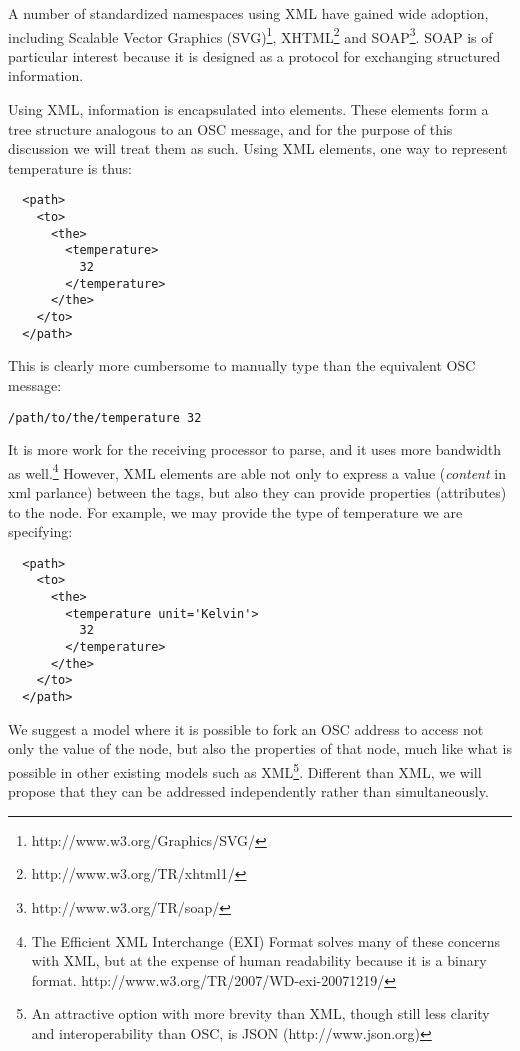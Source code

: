 \documentclass{NIME-alternate}
\begin{document}

A number of standardized namespaces using XML have gained wide adoption, including Scalable Vector Graphics (SVG)\footnote{http://www.w3.org/Graphics/SVG/}, XHTML\footnote{http://www.w3.org/TR/xhtml1/} and SOAP\footnote{http://www.w3.org/TR/soap/}.  SOAP is of particular interest because it is designed as a protocol for exchanging structured information.

Using XML, information is encapsulated into elements.  These elements form a tree structure analogous to an OSC message, and for the purpose of this discussion we will treat them as such.  Using XML elements, one way to represent temperature is thus:

\begin{lstlisting}
  <path>
    <to>
      <the>
        <temperature> 
          32
        </temperature>
      </the>
    </to>
  </path>
\end{lstlisting}

This is clearly more cumbersome to manually type than the equivalent OSC message:

\noindent
\texttt{/path/to/the/temperature 32}

It is more work for the receiving processor to parse, and it uses more bandwidth as well.\footnote{The Efficient XML Interchange (EXI) Format solves many of these concerns with XML, but at the expense of human readability because it is a binary format.  http://www.w3.org/TR/2007/WD-exi-20071219/} However, XML elements are able not only to express a value (\emph{content} in xml parlance) between the tags, but also they can provide properties (attributes) to the node. For example, we may provide the type of temperature we are specifying:

\begin{lstlisting}
  <path>
    <to>
      <the>
        <temperature unit='Kelvin'>
          32
        </temperature>
      </the>
    </to>
  </path>
\end{lstlisting}

We suggest a model where it is possible to fork an OSC address to access not only the value of the node, but also the properties of that node, much like what is possible in other existing models such as XML\footnote{An attractive option with more brevity than XML, though still less clarity and interoperability than OSC, is JSON (http://www.json.org)}.  Different than XML, we will propose that they can be addressed independently rather than simultaneously.
\end{document}
